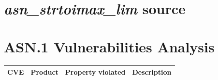 \documentclass[acmsmall,nonacm]{acmart}
\begin{document}
\appendix
\clearpage
\section{\emph{asn\_strtoimax\_lim} source}
\label{sec:stritomax}



\newpage

\section{ASN.1 Vulnerabilities Analysis}

\bigskip

\scriptsize

\begin{longtable}{ l l l p{15em} }
 
  {\bf CVE } &  {\bf Product  } &  {\bf Property violated  }  &  {\bf Description  } \\

  \hline


\end{longtable}
\end{document}
